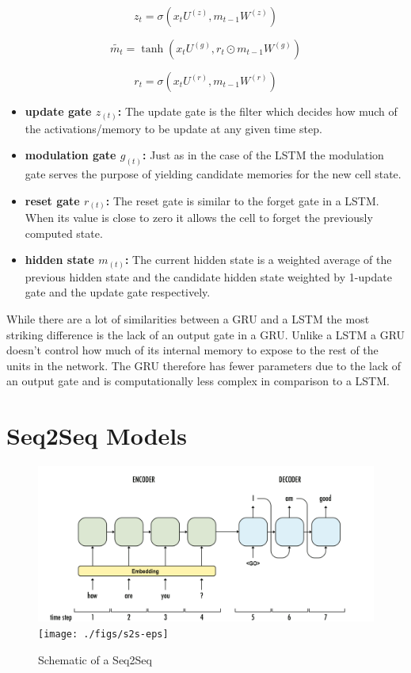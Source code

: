 \begin{equation}
z_t= \sigma(x_t U^{(z)}, m_{t-1}W^{(z)})
\end{equation}

\begin{equation}
\widetilde {m_t}= \tanh(x_t U^{(g)},r_t \odot m_{t-1}W^{(g)})
\end{equation}

\begin{equation}
r_t= \sigma(x_t U^{(r)}, m_{t-1}W^{(r)})
\end{equation}

\begin{itemize}
	\item \textbf{update gate $z_{(t)}$:} The update gate is the filter which decides how much of the activations/memory to be update at any given time step.
	\item \textbf{modulation gate $g_{(t)}$:} Just as in the case of the LSTM the modulation gate serves the purpose of yielding candidate memories for the new cell state.
	\item \textbf{reset gate $r_{(t)}$:} The reset gate is similar to the forget gate in a LSTM. When its value is close to zero it allows the cell to forget the previously computed state.
	\item \textbf{hidden state $m_{(t)}$:} The current hidden state is a weighted average of the previous hidden state and the candidate hidden state weighted by 1-update gate and the update gate respectively.
\end{itemize}

While there are a lot of similarities between a GRU and a LSTM the most striking difference is the lack of an output gate in a GRU. Unlike a LSTM a GRU doesn't control how much of its internal memory to expose to the rest of the units in the network. The GRU therefore has fewer parameters due to the lack of an output gate and is computationally less complex in comparison to a LSTM.

\section{Seq2Seq Models}\label{background:s2s}
\begin{figure}
	\begin{minipage}[t]{\textwidth}
		\ifpdf
		\includegraphics[width=\linewidth,keepaspectratio=true]{./figs/s2s-pdf}
		\else
		\texttt{[image: ./figs/s2s-eps]}
		\fi
		\caption{\small Schematic of a Seq2Seq}
		\label{bck:s2s}
	\end{minipage}
\end{figure}

